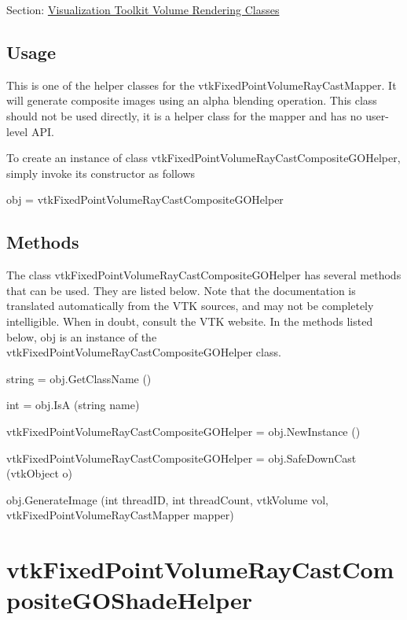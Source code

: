 Section\-: \hyperlink{sec_vtkvolumerendering}{Visualization Toolkit Volume Rendering Classes} \hypertarget{vtkwidgets_vtkxyplotwidget_Usage}{}\subsection{Usage}\label{vtkwidgets_vtkxyplotwidget_Usage}
This is one of the helper classes for the vtk\-Fixed\-Point\-Volume\-Ray\-Cast\-Mapper. It will generate composite images using an alpha blending operation. This class should not be used directly, it is a helper class for the mapper and has no user-\/level A\-P\-I.

To create an instance of class vtk\-Fixed\-Point\-Volume\-Ray\-Cast\-Composite\-G\-O\-Helper, simply invoke its constructor as follows \begin{DoxyVerb}  obj = vtkFixedPointVolumeRayCastCompositeGOHelper
\end{DoxyVerb}
 \hypertarget{vtkwidgets_vtkxyplotwidget_Methods}{}\subsection{Methods}\label{vtkwidgets_vtkxyplotwidget_Methods}
The class vtk\-Fixed\-Point\-Volume\-Ray\-Cast\-Composite\-G\-O\-Helper has several methods that can be used. They are listed below. Note that the documentation is translated automatically from the V\-T\-K sources, and may not be completely intelligible. When in doubt, consult the V\-T\-K website. In the methods listed below, {\ttfamily obj} is an instance of the vtk\-Fixed\-Point\-Volume\-Ray\-Cast\-Composite\-G\-O\-Helper class. 
\begin{DoxyItemize}
\item {\ttfamily string = obj.\-Get\-Class\-Name ()}  
\item {\ttfamily int = obj.\-Is\-A (string name)}  
\item {\ttfamily vtk\-Fixed\-Point\-Volume\-Ray\-Cast\-Composite\-G\-O\-Helper = obj.\-New\-Instance ()}  
\item {\ttfamily vtk\-Fixed\-Point\-Volume\-Ray\-Cast\-Composite\-G\-O\-Helper = obj.\-Safe\-Down\-Cast (vtk\-Object o)}  
\item {\ttfamily obj.\-Generate\-Image (int thread\-I\-D, int thread\-Count, vtk\-Volume vol, vtk\-Fixed\-Point\-Volume\-Ray\-Cast\-Mapper mapper)}  
\end{DoxyItemize}\hypertarget{vtkvolumerendering_vtkfixedpointvolumeraycastcompositegoshadehelper}{}\section{vtk\-Fixed\-Point\-Volume\-Ray\-Cast\-Composite\-G\-O\-Shade\-Helper}\label{vtkvolumerendering_vtkfixedpointvolumeraycastcompositegoshadehelper}
